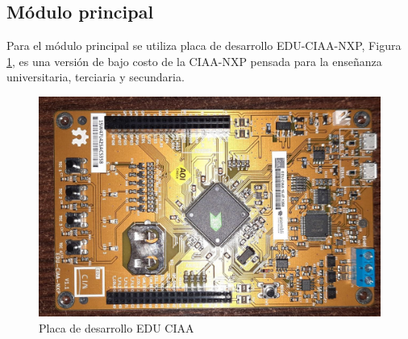 \subsection{Módulo principal}\label{sec:moduloPrincipal}
Para el módulo principal se utiliza placa de desarrollo EDU-CIAA-NXP, Figura \ref{fig:EduCiaaPlaca}, es una versión de bajo costo de la CIAA-NXP \cite{proyectoCIAA} pensada para la enseñanza universitaria, terciaria y secundaria. 
\begin{figure}[H]
    \centering
    \includegraphics[width=0.6\linewidth]{Figuras/datalogger/Hardware/EduCiaaPlaca.jpg}
    \caption{Placa de desarrollo EDU CIAA}
    \label{fig:EduCiaaPlaca}
\end{figure}



  
  
